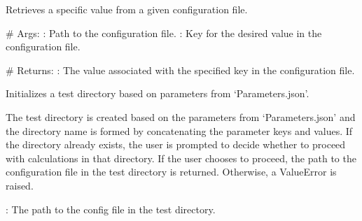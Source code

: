 \documentclass[letterpaper,10pt,english]{sphinxmanual}
\begin{document}
\begin{fulllineitems}
\begin{description}
\end{description}

\begin{fulllineitems}
\label{\detokenize{FileHelper:FileHelper.FileHelper.give_config_value}}
\pysigstartsignatures
{}
\pysigstopsignatures
\sphinxAtStartPar
Retrieves a specific value from a given configuration file.

\sphinxAtStartPar
\# Args:
\sphinxhyphen{} : Path to the configuration file.
\sphinxhyphen{} : Key for the desired value in the configuration file.

\sphinxAtStartPar
\# Returns:
\sphinxhyphen{} : The value associated with the specified key in the configuration file.

\end{fulllineitems}


\begin{fulllineitems}
\label{\detokenize{FileHelper:FileHelper.FileHelper.init_test_directory}}
\pysigstartsignatures
{}
\pysigstopsignatures
\sphinxAtStartPar
Initializes a test directory based on parameters from ‘Parameters.json’.
\begin{description}
\sphinxAtStartPar
The test directory is created based on the parameters from ‘Parameters.json’ and the
directory name is formed by concatenating the parameter keys and values. If the directory
already exists, the user is prompted to decide whether to proceed with calculations in that
directory. If the user chooses to proceed, the path to the configuration file in the test
directory is returned. Otherwise, a ValueError is raised.

\sphinxAtStartPar
{}: The path to the config file in the test directory.

\end{description}

\end{fulllineitems}


\end{fulllineitems}
\end{document}
